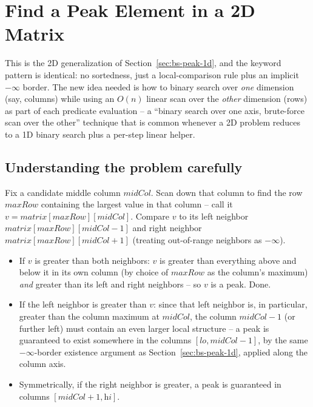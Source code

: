 \section{Find a Peak Element in a 2D Matrix}
\label{sec:bs-peak-2d}


\begin{patternbox}
This is the 2D generalization of Section~\ref{sec:bs-peak-1d}, and the
keyword pattern is identical: no sortedness, just a local-comparison rule
plus an implicit $-\infty$ border. The new idea needed is how to binary
search over \emph{one} dimension (say, columns) while using an $O(n)$
linear scan over the \emph{other} dimension (rows) as part of each
predicate evaluation -- a ``binary search over one axis, brute-force scan
over the other'' technique that is common whenever a 2D problem reduces
to a 1D binary search plus a per-step linear helper.
\end{patternbox}

\subsection*{Understanding the problem carefully}

Fix a candidate middle column $\textit{midCol}$. Scan down that column to
find the row $\textit{maxRow}$ containing the largest value in that
column -- call it $v = \textit{matrix}[\textit{maxRow}][\textit{midCol}]$.
Compare $v$ to its left neighbor $\textit{matrix}[\textit{maxRow}]
[\textit{midCol}-1]$ and right neighbor
$\textit{matrix}[\textit{maxRow}][\textit{midCol}+1]$ (treating
out-of-range neighbors as $-\infty$).

\begin{itemize}
  \item If $v$ is greater than both neighbors: $v$ is greater than
        everything above and below it in its own column (by choice of
        $\textit{maxRow}$ as the column's maximum) \emph{and} greater than
        its left and right neighbors -- so $v$ is a peak. Done.
  \item If the left neighbor is greater than $v$: since that left
        neighbor is, in particular, greater than the column maximum at
        $\textit{midCol}$, the column $\textit{midCol}-1$ (or further
        left) must contain an even larger local structure -- a peak is
        guaranteed to exist somewhere in the columns
        $[\textit{lo}, \textit{midCol}-1]$, by the same $-\infty$-border
        existence argument as Section~\ref{sec:bs-peak-1d}, applied along
        the column axis.
  \item Symmetrically, if the right neighbor is greater, a peak is
        guaranteed in columns $[\textit{midCol}+1, \textit{hi}]$.
\end{itemize}

